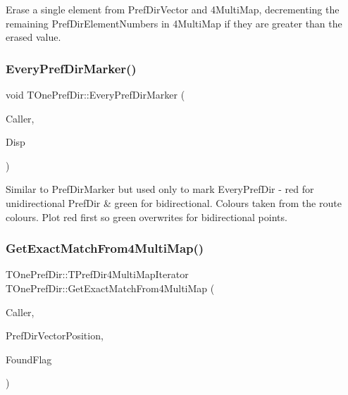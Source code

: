 Erase a single element from Pref\+Dir\+Vector and 4\+Multi\+Map, decrementing the remaining Pref\+Dir\+Element\+Numbers in 4\+Multi\+Map if they are greater than the erased value. \mbox{\label{class_t_one_pref_dir_a9b425a3ed8ef998e2366d13ad52bf08c}} 
\subsubsection{\texorpdfstring{Every\+Pref\+Dir\+Marker()}{EveryPrefDirMarker()}}
{\footnotesize\ttfamily void T\+One\+Pref\+Dir\+::\+Every\+Pref\+Dir\+Marker (\begin{DoxyParamCaption}\item[{int}]{Caller,  }\item[{\mbox{\hyperlink{class_t_display}{T\+Display}} $\ast$}]{Disp }\end{DoxyParamCaption})}

Similar to Pref\+Dir\+Marker but used only to mark Every\+Pref\+Dir -\/ red for unidirectional Pref\+Dir \& green for bidirectional. Colours taken from the route colours. Plot red first so green overwrites for bidirectional points. \mbox{\label{class_t_one_pref_dir_a8bc65b139325c45b57a9f43a9b3404a8}} 
\subsubsection{\texorpdfstring{Get\+Exact\+Match\+From4\+Multi\+Map()}{GetExactMatchFrom4MultiMap()}}
{\footnotesize\ttfamily T\+One\+Pref\+Dir\+::\+T\+Pref\+Dir4\+Multi\+Map\+Iterator T\+One\+Pref\+Dir\+::\+Get\+Exact\+Match\+From4\+Multi\+Map (\begin{DoxyParamCaption}\item[{int}]{Caller,  }\item[{unsigned int}]{Pref\+Dir\+Vector\+Position,  }\item[{bool \&}]{Found\+Flag }\end{DoxyParamCaption})\hspace{0.3cm}{\ttfamily [private]}}

